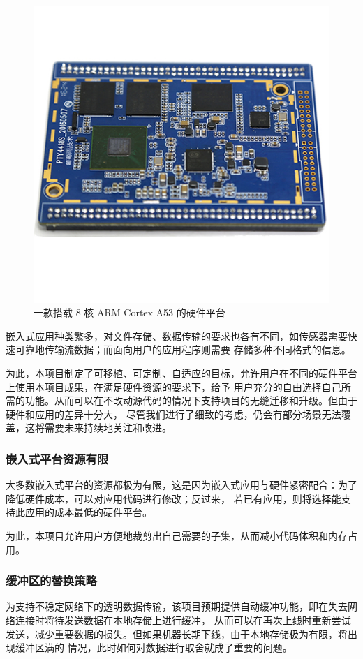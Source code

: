 \documentclass{ctexart}
\begin{document}
\begin{figure}
	\centering
	\includegraphics[scale=0.5]{ARM-Cortex.jpg}
	\caption{一款搭载 8 核 ARM Cortex A53 的硬件平台}
\end{figure}

嵌入式应用种类繁多，对文件存储、数据传输的要求也各有不同，如传感器需要快速可靠地传输流数据；而面向用户的应用程序则需要
存储多种不同格式的信息。

为此，本项目制定了可移植、可定制、自适应的目标，允许用户在不同的硬件平台上使用本项目成果，在满足硬件资源的要求下，给予
用户充分的自由选择自己所需的功能。从而可以在不改动源代码的情况下支持项目的无缝迁移和升级。但由于硬件和应用的差异十分大，
尽管我们进行了细致的考虑，仍会有部分场景无法覆盖，这将需要未来持续地关注和改进。

\subsubsection{嵌入式平台资源有限}
大多数嵌入式平台的资源都极为有限，这是因为嵌入式应用与硬件紧密配合：为了降低硬件成本，可以对应用代码进行修改；反过来，
若已有应用，则将选择能支持此应用的成本最低的硬件平台。

为此，本项目允许用户方便地裁剪出自己需要的子集，从而减小代码体积和内存占用。

\subsubsection{缓冲区的替换策略}
为支持不稳定网络下的透明数据传输，该项目预期提供自动缓冲功能，即在失去网络连接时将待发送数据在本地存储上进行缓冲，
从而可以在再次上线时重新尝试发送，减少重要数据的损失。但如果机器长期下线，由于本地存储极为有限，将出现缓冲区满的
情况，此时如何对数据进行取舍就成了重要的问题。
\end{document}
